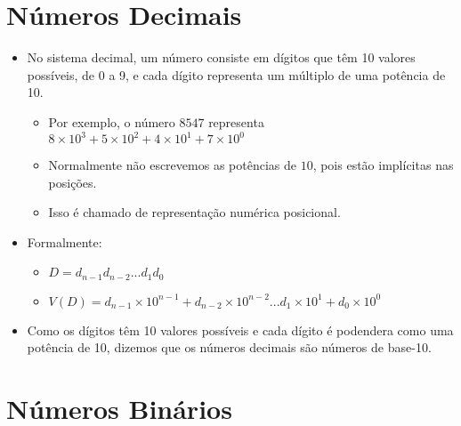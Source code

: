 \section{Números Decimais}

\begin{frame}{\insertsection}
	\begin{itemize}
        \item No sistema decimal, um número consiste em dígitos que têm 10 valores possíveis, de 0 a 9, e cada dígito representa um múltiplo de uma potência de 10.
        \begin{itemize}
            \item Por exemplo, o número $8547$ representa $8 \times 10^3 + 5 \times 10^2 +4 \times 10^1 + 7 \times 10^0$
            \item Normalmente não escrevemos as potências de $10$, pois estão implícitas nas posições.
            \item Isso é chamado de representação numérica posicional. 
        \end{itemize} 
        \item Formalmente:
        \begin{itemize}
            \item $D = d_{n-1}d_{n-2} ... d_1 d_0$
            \item $V(D) = d_{n-1} \times 10^{n-1} + d_{n-2} \times 10^{n-2} ... d_1 \times 10^1 + d_0 \times 10^0$
        \end{itemize}
        \item Como os dígitos têm 10 valores possíveis e cada dígito é podendera como uma potência de 10, dizemos que os números decimais são números de base-10.
    \end{itemize}
\end{frame}

\section{Números Binários}

